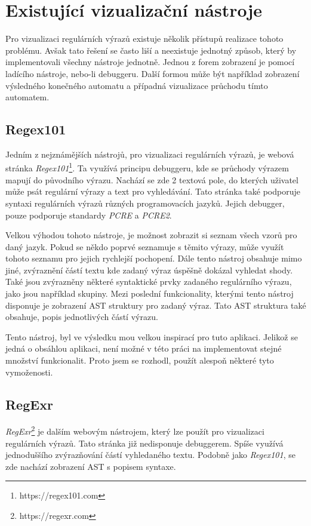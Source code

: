 \chapter{Existující vizualizační nástroje}\label{sec:ExistingApplications}

Pro vizualizaci regulárních výrazů existuje několik přístupů realizace tohoto problému.
Avšak tato řešení se často liší a neexistuje jednotný způsob, který by implementovali všechny nástroje jednotně.
Jednou z forem zobrazení je pomocí ladícího nástroje, nebo-li debuggeru.
Další formou může být například zobrazení výsledného konečného automatu a případná vizualizace průchodu tímto automatem.

\section{Regex101}

Jedním z nejznámějších nástrojů, pro vizualizaci regulárních výrazů, je webová stránka \textit{Regex101}\footnote{https://regex101.com}.
Ta využívá principu debuggeru, kde se průchody výrazem mapují do původního výrazu.
Nachází se zde 2 textová pole, do kterých uživatel může psát regulární výrazy a text pro vyhledávání.
Tato stránka také podporuje syntaxi regulárních výrazů různých programovacích jazyků.
Jejich debugger, pouze podporuje standardy \textit{PCRE} a \textit{PCRE2}.

Velkou výhodou tohoto nástroje, je možnost zobrazit si seznam všech vzorů pro daný jazyk.
Pokud se někdo poprvé seznamuje s těmito výrazy, může využít tohoto seznamu pro jejich rychlejší pochopení.
Dále tento nástroj obsahuje mimo jiné, zvýraznění částí textu kde zadaný výraz úspěšně dokázal vyhledat shody.
Také jsou zvýrazněny některé syntaktické prvky zadaného regulárního výrazu, jako jsou například skupiny.
Mezi poslední funkcionality, kterými tento nástroj disponuje je zobrazení AST struktury pro zadaný výraz.
Tato AST struktura také obsahuje, popis jednotlivých částí výrazu.

Tento nástroj, byl ve výsledku mou velkou inspirací pro tuto aplikaci. 
Jelikož se jedná o obsáhlou aplikaci, není možné v této práci na implementovat stejné množství funkcionalit.
Proto jsem se rozhodl, použít alespoň některé tyto vymoženosti.

\section{RegExr}

\textit{RegExr}\footnote{https://regexr.com} je dalším webovým nástrojem, který lze použít pro vizualizaci regulárních výrazů.
Tato stránka již nedisponuje debuggerem.
Spíše využívá jednoduššího zvýrazňování částí vyhledaného textu.
Podobně jako \textit{Regex101}, se zde nachází zobrazení AST s popisem syntaxe.

